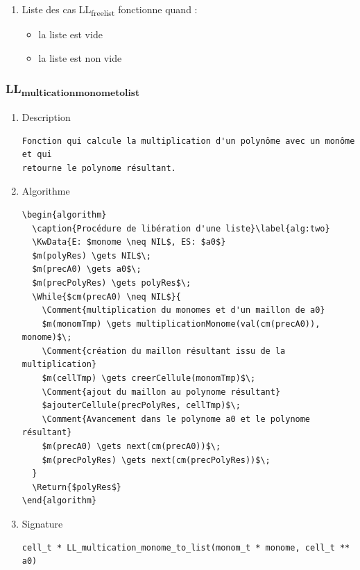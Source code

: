 \documentclass[11pt]{article}
\begin{document}
\begin{enumerate}
\item Liste des cas
\label{sec:org5c146b1}
LL\textsubscript{free}\textsubscript{list} fonctionne quand :
\begin{itemize}
\item la liste est vide
\item la liste est non vide
\end{itemize}
\end{enumerate}


\subsubsection{LL\textsubscript{multication}\textsubscript{monome}\textsubscript{to}\textsubscript{list}}
\label{sec:org49ac355}
\begin{enumerate}
\item Description
\label{sec:org81b18d3}

\begin{verbatim}
Fonction qui calcule la multiplication d'un polynôme avec un monôme et qui
retourne le polynome résultant.
\end{verbatim}

\item Algorithme
\label{sec:org162f192}

\begin{verbatim}
\begin{algorithm}
  \caption{Procédure de libération d'une liste}\label{alg:two}
  \KwData{E: $monome \neq NIL$, ES: $a0$}
  $m(polyRes) \gets NIL$\;
  $m(precA0) \gets a0$\;
  $m(precPolyRes) \gets polyRes$\;
  \While{$cm(precA0) \neq NIL$}{
    \Comment{multiplication du monomes et d'un maillon de a0}
    $m(monomTmp) \gets multiplicationMonome(val(cm(precA0)), monome)$\;
    \Comment{création du maillon résultant issu de la multiplication}
    $m(cellTmp) \gets creerCellule(monomTmp)$\;
    \Comment{ajout du maillon au polynome résultant}
    $ajouterCellule(precPolyRes, cellTmp)$\;
    \Comment{Avancement dans le polynome a0 et le polynome résultant}
    $m(precA0) \gets next(cm(precA0))$\;
    $m(precPolyRes) \gets next(cm(precPolyRes))$\;
  }
  \Return{$polyRes$}
\end{algorithm}
\end{verbatim}

\item Signature
\label{sec:orgc2d6d70}

\begin{verbatim}
cell_t * LL_multication_monome_to_list(monom_t * monome, cell_t **  a0)
\end{verbatim}


\end{enumerate}
\end{document}
